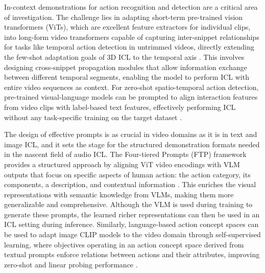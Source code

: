 \documentclass[11pt]{article}
\begin{document}
In-context demonstrations for action recognition and detection are a critical area of investigation. The challenge lies in adapting short-term pre-trained vision transformers (ViTs), which are excellent feature extractors for individual clips, into long-form video transformers capable of capturing inter-snippet relationships for tasks like temporal action detection in untrimmed videos, directly extending the few-shot adaptation goals of 3D ICL to the temporal axis \cite{ref269}. This involves designing cross-snippet propagation modules that allow information exchange between different temporal segments, enabling the model to perform ICL with entire video sequences as context. For zero-shot spatio-temporal action detection, pre-trained visual-language models can be prompted to align interaction features from video clips with label-based text features, effectively performing ICL without any task-specific training on the target dataset \cite{ref270}.

The design of effective prompts is as crucial in video domains as it is in text and image ICL, and it sets the stage for the structured demonstration formats needed in the nascent field of audio ICL. The Four-tiered Prompts (FTP) framework provides a structured approach by aligning ViT video encodings with VLM outputs that focus on specific aspects of human action: the action category, its components, a description, and contextual information \cite{ref271}. This enriches the visual representations with semantic knowledge from VLMs, making them more generalizable and comprehensive. Although the VLM is used during training to generate these prompts, the learned richer representations can then be used in an ICL setting during inference. Similarly, language-based action concept spaces can be used to adapt image CLIP models to the video domain through self-supervised learning, where objectives operating in an action concept space derived from textual prompts enforce relations between actions and their attributes, improving zero-shot and linear probing performance \cite{ref272}.
\end{document}
